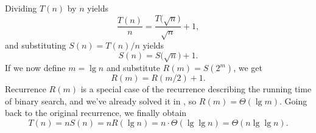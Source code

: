 Dividing $T(n)$ by $n$ yields
\[
    \frac{T(n)}{n} = \frac{T\bigl(\sqrt{n}\bigr)}{\sqrt{n}}+1,
\]
and substituting $S(n)=T(n)/n$ yields
\[
    S(n) = S\bigl(\sqrt{n}\bigr)+1.
\]
If we now define $m=\lg n$ and substitute $R(m)=S(2^m)$, we get
\[
    R(m) = R(m/2)+1.
\]
Recurrence $R(m)$ is a special case of the recurrence describing the running time of binary search, and we've already solved it in , so $R(m)=\Theta(\lg m)$.
Going back to the original recurrence, we finally obtain
\[
    T(n) = nS(n) = nR(\lg n) = n\cdot\Theta(\lg\lg n) = \Theta(n\lg\lg n).
\]
